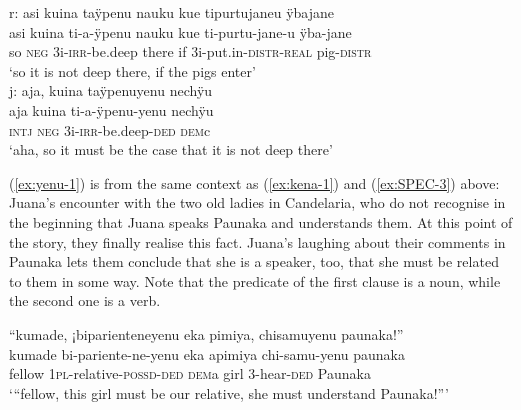 \ea\label{ex:yenu-2}
  \ea\label{ex:yenu-2.1}
\begingl
\glpreamble \textup{r:} asi kuina taÿpenu nauku kue tipurtujaneu ÿbajane\\
\gla asi kuina ti-a-ÿpenu nauku kue ti-purtu-jane-u ÿba-jane\\ 
\glb so \textsc{neg} 3i-\textsc{irr}-be.deep there if 3i-put.in-\textsc{distr}-\textsc{real} pig-\textsc{distr}\\ 
\glft ‘so it is not deep there, if the pigs enter’\\ 
\endgl
  \ex\label{ex:yenu-2.2}
\begingl
\glpreamble \textup{j:} aja, kuina taÿpenuyenu nechÿu\\
\gla aja kuina ti-a-ÿpenu-yenu nechÿu\\
\glb \textsc{intj} \textsc{neg} 3i-\textsc{irr}-be.deep-\textsc{ded} \textsc{dem}c\\
\glft ‘aha, so it must be the case that it is not deep there’
\endgl
{}
\z
\xe


(\ref{ex:yenu-1}) is from the same context as (\ref{ex:kena-1}) and (\ref{ex:SPEC-3}) above: Juana’s encounter with the two old ladies in Candelaria, who do not recognise in the beginning that Juana speaks Paunaka and understands them. At this point of the story, they finally realise this fact.  Juana’s laughing about their comments in Paunaka lets them conclude that she is a speaker, too, that she must be related to them in some way. Note that the predicate of the first clause is a noun, while the second one is a verb.

\ea\label{ex:yenu-1}
\begingl 
\glpreamble “kumade, ¡biparienteneyenu eka pimiya, chisamuyenu paunaka!”\\
\gla kumade bi-pariente-ne-yenu eka apimiya chi-samu-yenu paunaka\\ 
\glb fellow 1\textsc{pl}-relative-\textsc{possd}-\textsc{ded} \textsc{dem}a girl 3-hear-\textsc{ded} Paunaka\\ 
\glft ‘“fellow, this girl must be our relative, she must understand Paunaka!”’\\ 
\endgl
\trailingcitation{[jxx-p120515l-1.108]}
\xe


